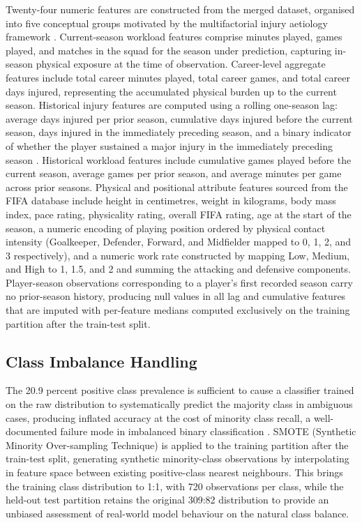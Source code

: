 \documentclass[conference]{IEEEtran}
\begin{document}
Twenty-four numeric features are constructed from the merged dataset, organised into five conceptual groups motivated by the multifactorial injury aetiology framework \cite{bahr2005understanding}. Current-season workload features comprise minutes played, games played, and matches in the squad for the season under prediction, capturing in-season physical exposure at the time of observation. Career-level aggregate features include total career minutes played, total career games, and total career days injured, representing the accumulated physical burden up to the current season. Historical injury features are computed using a rolling one-season lag: average days injured per prior season, cumulative days injured before the current season, days injured in the immediately preceding season, and a binary indicator of whether the player sustained a major injury in the immediately preceding season \cite{hagglund2006previous, arnason2004risk}. Historical workload features include cumulative games played before the current season, average games per prior season, and average minutes per game across prior seasons. Physical and positional attribute features sourced from the FIFA database include height in centimetres, weight in kilograms, body mass index, pace rating, physicality rating, overall FIFA rating, age at the start of the season, a numeric encoding of playing position ordered by physical contact intensity (Goalkeeper, Defender, Forward, and Midfielder mapped to 0, 1, 2, and 3 respectively), and a numeric work rate constructed by mapping Low, Medium, and High to 1, 1.5, and 2 and summing the attacking and defensive components. Player-season observations corresponding to a player's first recorded season carry no prior-season history, producing null values in all lag and cumulative features that are imputed with per-feature medians computed exclusively on the training partition after the train-test split.

\subsection{Class Imbalance Handling}

The 20.9 percent positive class prevalence is sufficient to cause a classifier trained on the raw distribution to systematically predict the majority class in ambiguous cases, producing inflated accuracy at the cost of minority class recall, a well-documented failure mode in imbalanced binary classification \cite{he2009learning}. SMOTE (Synthetic Minority Over-sampling Technique) \cite{chawla2002smote} is applied to the training partition after the train-test split, generating synthetic minority-class observations by interpolating in feature space between existing positive-class nearest neighbours. This brings the training class distribution to 1:1, with 720 observations per class, while the held-out test partition retains the original 309:82 distribution to provide an unbiased assessment of real-world model behaviour on the natural class balance.
\end{document}
